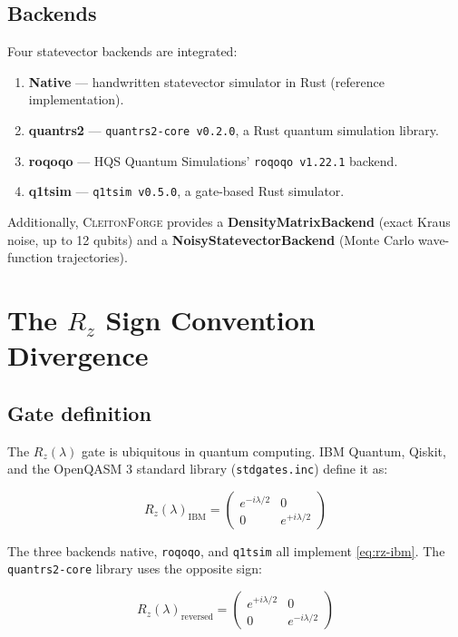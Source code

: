 \documentclass[11pt,a4paper]{article}
\begin{document}
\subsection{Backends}

Four statevector backends are integrated:
\begin{enumerate}
  \item \textbf{Native} --- handwritten statevector simulator in Rust (reference implementation).
  \item \textbf{quantrs2} --- \texttt{quantrs2-core v0.2.0}, a Rust quantum simulation library.
  \item \textbf{roqoqo} --- HQS Quantum Simulations' \texttt{roqoqo v1.22.1} backend.
  \item \textbf{q1tsim} --- \texttt{q1tsim v0.5.0}, a gate-based Rust simulator.
\end{enumerate}

Additionally, \textsc{CleitonForge} provides a \textbf{DensityMatrixBackend}
(exact Kraus noise, up to 12 qubits) and a \textbf{NoisyStatevectorBackend}
(Monte Carlo wave-function trajectories).

\section{The $R_z$ Sign Convention Divergence}

\subsection{Gate definition}

The $R_z(\lambda)$ gate is ubiquitous in quantum computing. IBM Quantum, Qiskit,
and the OpenQASM 3 standard library (\texttt{stdgates.inc}) define it as:

\begin{equation}
  R_z(\lambda)_{\mathrm{IBM}} =
  \begin{pmatrix} e^{-i\lambda/2} & 0 \\ 0 & e^{+i\lambda/2} \end{pmatrix}
  \label{eq:rz-ibm}
\end{equation}

The three backends native, \texttt{roqoqo}, and \texttt{q1tsim} all implement
\cref{eq:rz-ibm}. The \texttt{quantrs2-core} library uses the opposite sign:

\begin{equation}
  R_z(\lambda)_{\mathrm{reversed}} =
  \begin{pmatrix} e^{+i\lambda/2} & 0 \\ 0 & e^{-i\lambda/2} \end{pmatrix}
  \label{eq:rz-reversed}
\end{equation}
\end{document}
